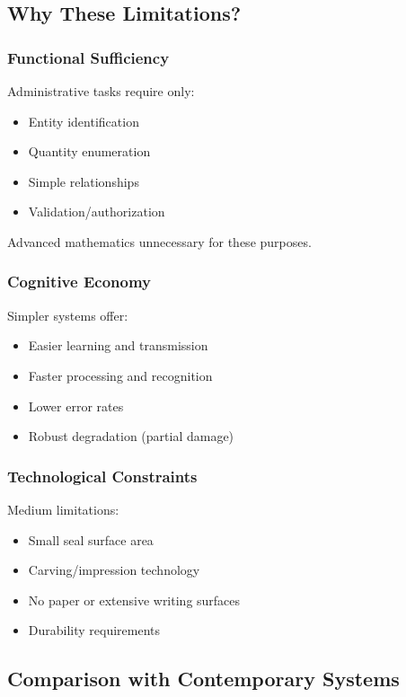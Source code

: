 \subsection{Why These Limitations?}

\subsubsection{Functional Sufficiency}
Administrative tasks require only:
\begin{itemize}
    \item Entity identification
    \item Quantity enumeration
    \item Simple relationships
    \item Validation/authorization
\end{itemize}

Advanced mathematics unnecessary for these purposes.

\subsubsection{Cognitive Economy}
Simpler systems offer:
\begin{itemize}
    \item Easier learning and transmission
    \item Faster processing and recognition
    \item Lower error rates
    \item Robust degradation (partial damage)
\end{itemize}

\subsubsection{Technological Constraints}
Medium limitations:
\begin{itemize}
    \item Small seal surface area
    \item Carving/impression technology
    \item No paper or extensive writing surfaces
    \item Durability requirements
\end{itemize}

\subsection{Comparison with Contemporary Systems}


